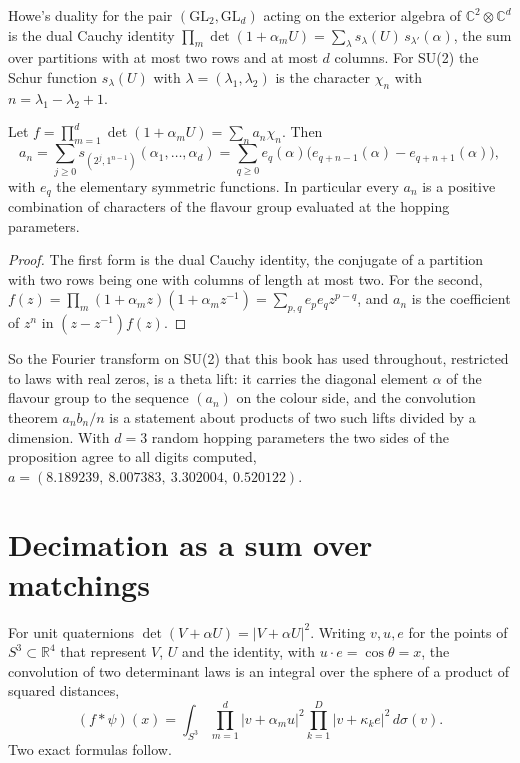 Howe's duality \cite{Ho89} for the pair $(\mathrm{GL}_2,\mathrm{GL}_d)$ acting on the exterior algebra of $\mathbb C^2\otimes\mathbb C^d$ is the dual Cauchy identity $\prod_m\det(1+\alpha_mU)=\sum_\lambda s_\lambda(U)\,s_{\lambda'}(\alpha)$, the sum over partitions with at most two rows and at most $d$ columns. For SU(2) the Schur function $s_\lambda(U)$ with $\lambda=(\lambda_1,\lambda_2)$ is the character $\chi_n$ with $n=\lambda_1-\lambda_2+1$.

\begin{proposition}\label{prop:howe}
Let $f=\prod_{m=1}^d\det(1+\alpha_mU)=\sum_na_n\chi_n$. Then
\[
a_n=\sum_{j\ge0}s_{(2^j,1^{n-1})}(\alpha_1,\dots,\alpha_d)=\sum_{q\ge0}e_q(\alpha)\big(e_{q+n-1}(\alpha)-e_{q+n+1}(\alpha)\big),
\]
with $e_q$ the elementary symmetric functions. In particular every $a_n$ is a positive combination of characters of the flavour group evaluated at the hopping parameters.
\end{proposition}

\begin{proof}
The first form is the dual Cauchy identity, the conjugate of a partition with two rows being one with columns of length at most two. For the second, $f(z)=\prod_m(1+\alpha_mz)(1+\alpha_mz^{-1})=\sum_{p,q}e_pe_qz^{p-q}$, and $a_n$ is the coefficient of $z^n$ in $(z-z^{-1})f(z)$.
\end{proof}

So the Fourier transform on SU(2) that this book has used throughout, restricted to laws with real zeros, is a theta lift: it carries the diagonal element $\alpha$ of the flavour group to the sequence $(a_n)$ on the colour side, and the convolution theorem $a_nb_n/n$ is a statement about products of two such lifts divided by a dimension. With $d=3$ random hopping parameters the two sides of the proposition agree to all digits computed, $a=(8.189239,\ 8.007383,\ 3.302004,\ 0.520122)$.

\section{Decimation as a sum over matchings}\label{sec:t11match}

For unit quaternions $\det(V+\alpha U)=|V+\alpha U|^2$. Writing $v,u,e$ for the points of $S^3\subset\mathbb R^4$ that represent $V$, $U$ and the identity, with $u\cdot e=\cos\theta=x$, the convolution of two determinant laws is an integral over the sphere of a product of squared distances,
\[
(f*\psi)(x)=\int_{S^3}\prod_{m=1}^d\big|v+\alpha_mu\big|^2\prod_{k=1}^D\big|v+\kappa_ke\big|^2\,d\sigma(v).
\]
Two exact formulas follow.


